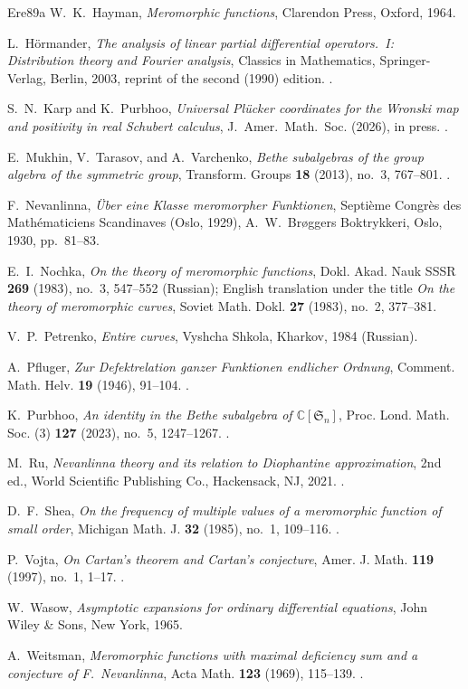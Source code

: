 \documentclass[12pt,letterpaper,reqno]{amsart}
\theoremstyle{definition}
\numberwithin{equation}{section}
\newcommand{\C}{\mathbb C}
\begin{document}
\begin{thebibliography}{Ere89a}
W.~K.~Hayman,
\emph{Meromorphic functions},
Clarendon Press, Oxford, 1964.

L.~H\"ormander,
\emph{The analysis of linear partial differential operators.~I:
Distribution theory and Fourier analysis},
Classics in Mathematics, Springer-Verlag, Berlin, 2003,
reprint of the second (1990) edition.
.

S.~N.~Karp and K.~Purbhoo,
\emph{Universal Pl\"ucker coordinates for the Wronski map and positivity
in real Schubert calculus},
J.~Amer.~Math.~Soc. (2026), in press.
.

E.~Mukhin, V.~Tarasov, and A.~Varchenko,
\emph{Bethe subalgebras of the group algebra of the symmetric group},
Transform. Groups \textbf{18} (2013), no.~3, 767--801.
.

F.~Nevanlinna,
\emph{\"Uber eine Klasse meromorpher Funktionen},
Septi\`eme Congr\`es des Math\'ematiciens Scandinaves
(Oslo, 1929), A.~W.~Br\o ggers Boktrykkeri, Oslo, 1930, pp.~81--83.

E.~I.~Nochka,
\emph{On the theory of meromorphic functions},
Dokl. Akad. Nauk SSSR \textbf{269} (1983), no.~3, 547--552 (Russian);
English translation under the title \emph{On the theory of meromorphic curves},
Soviet Math. Dokl. \textbf{27} (1983), no.~2, 377--381.

V.~P.~Petrenko,
\emph{Entire curves},
Vyshcha Shkola, Kharkov, 1984 (Russian).

A.~Pfluger,
\emph{Zur Defektrelation ganzer Funktionen endlicher Ordnung},
Comment. Math. Helv. \textbf{19} (1946), 91--104.
.

K.~Purbhoo,
\emph{An identity in the Bethe subalgebra of $\C[\mathfrak S_n]$},
Proc. Lond. Math. Soc. (3) \textbf{127} (2023), no.~5, 1247--1267.
.

M.~Ru,
\emph{Nevanlinna theory and its relation to Diophantine approximation},
2nd ed., World Scientific Publishing Co., Hackensack, NJ, 2021.
.

D.~F.~Shea,
\emph{On the frequency of multiple values of a meromorphic function of
small order},
Michigan Math. J. \textbf{32} (1985), no.~1, 109--116.
.

P.~Vojta,
\emph{On Cartan's theorem and Cartan's conjecture},
Amer. J. Math. \textbf{119} (1997), no.~1, 1--17.
.

W.~Wasow,
\emph{Asymptotic expansions for ordinary differential equations},
John Wiley \& Sons, New York, 1965.

A.~Weitsman,
\emph{Meromorphic functions with maximal deficiency sum and a conjecture
of F.~Nevanlinna},
Acta Math. \textbf{123} (1969), 115--139.
.

\end{thebibliography}
\appendix
\end{document}
